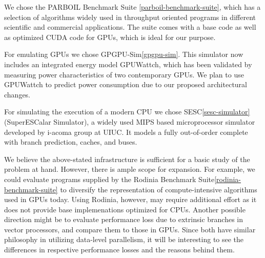 \par{
We chose the PARBOIL Benchmark Suite \ref{parboil-benchmark-suite}, which has a selection of algorithms widely used in throughput oriented programs in different scientific and commercial applications. The suite comes with a base code as well as optimized CUDA code for GPUs, which is ideal for our purpose.
}

\par{
For emulating GPUs we chose GPGPU-Sim\ref{gpgpu-sim}. This simulator now includes an integrated energy model GPUWattch, which has been validated by measuring power characteristics of two contemporary GPUs. We plan to use GPUWattch to predict power consumption due to our proposed architectural changes.
}

\par{
For simulating the execution of a modern CPU we chose SESC\ref{sesc-simulator} (SuperESCalar Simulator), a widely used MIPS based microprocessor simulator developed by i-acoma group at UIUC. It models a fully out-of-order complete with branch prediction, caches, and buses.
}

\par{We believe the above-stated infrastructure is sufficient for a basic study of the problem at hand. However, there is ample scope for expansion. For example, we could evaluate programs supplied by the Rodinia Benchmark Suite\ref{rodinia-benchmark-suite} to diversify the representation of compute-intensive algorithms used in GPUs today. Using Rodinia, however, may require additional effort as it does not provide base implemenations optimized for CPUs. Another possible direction might be to evaluate performance loss due to extrinsic branches in vector processors, and compare them to those in GPUs. Since both have similar philosophy in utilizing data-level parallelism, it will be interesting to see the differences in respective performance losses and the reasons behind them.}
